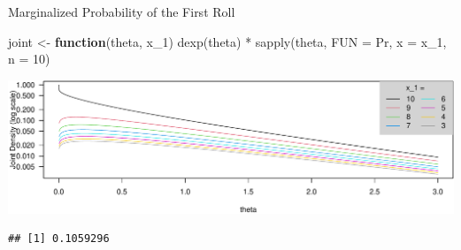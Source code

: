 \documentclass[
  ignorenonframetext,
]{beamer}
\newenvironment{Shaded}{\begin{snugshade}}{\end{snugshade}}
\newcommand{\AttributeTok}[1]{\textcolor[rgb]{0.77,0.63,0.00}{#1}}
\newcommand{\ConstantTok}[1]{\textcolor[rgb]{0.00,0.00,0.00}{#1}}
\newcommand{\ControlFlowTok}[1]{\textcolor[rgb]{0.13,0.29,0.53}{\textbf{#1}}}
\newcommand{\DecValTok}[1]{\textcolor[rgb]{0.00,0.00,0.81}{#1}}
\newcommand{\FunctionTok}[1]{\textcolor[rgb]{0.00,0.00,0.00}{#1}}
\newcommand{\NormalTok}[1]{#1}
\newcommand{\OtherTok}[1]{\textcolor[rgb]{0.56,0.35,0.01}{#1}}
\newcommand{\SpecialCharTok}[1]{\textcolor[rgb]{0.00,0.00,0.00}{#1}}
\begin{document}
\begin{frame}[fragile]{Marginalized Probability of the First Roll}
\protect\hypertarget{marginalized-probability-of-the-first-roll}{}
\begin{Shaded}
\begin{Highlighting}[]
\NormalTok{joint }\OtherTok{\textless{}{-}} \ControlFlowTok{function}\NormalTok{(theta, x\_1) }\FunctionTok{dexp}\NormalTok{(theta) }\SpecialCharTok{*} \FunctionTok{sapply}\NormalTok{(theta, }\AttributeTok{FUN =}\NormalTok{ Pr, }\AttributeTok{x =}\NormalTok{ x\_1, }\AttributeTok{n =} \DecValTok{10}\NormalTok{)}
\end{Highlighting}
\end{Shaded}

\includegraphics{Slides04_files/figure-beamer/unnamed-chunk-12-1.pdf}

\begin{Shaded}
\end{Shaded}

\begin{verbatim}
## [1] 0.1059296
\end{verbatim}
\end{frame}
\end{document}
